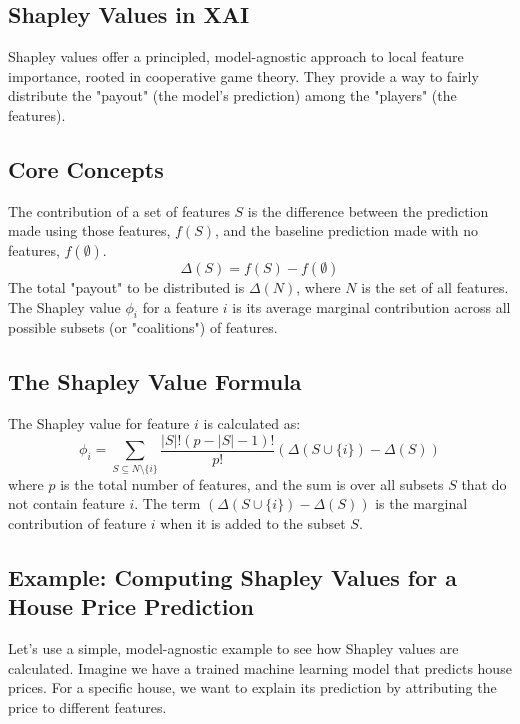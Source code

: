 \documentclass{article}
\begin{document}
\begin{multicols}{2}
\section{Shapley Values in XAI}
Shapley values offer a principled, model-agnostic approach to local feature importance, rooted in cooperative game theory. They provide a way to fairly distribute the "payout" (the model's prediction) among the "players" (the features).

\subsection{Core Concepts}
The contribution of a set of features $S$ is the difference between the prediction made using those features, $f(S)$, and the baseline prediction made with no features, $f(\emptyset)$.
$$ \Delta(S) = f(S) - f(\emptyset) $$
The total "payout" to be distributed is $\Delta(N)$, where $N$ is the set of all features. The Shapley value $\phi_i$ for a feature $i$ is its average marginal contribution across all possible subsets (or "coalitions") of features.

\subsection{The Shapley Value Formula}
The Shapley value for feature $i$ is calculated as:
$$ \phi_i = \sum_{S \subseteq N \setminus \{i\}} \frac{|S|!(p - |S| - 1)!}{p!} \left( \Delta(S \cup \{i\}) - \Delta(S) \right) $$
where $p$ is the total number of features, and the sum is over all subsets $S$ that do not contain feature $i$. The term $(\Delta(S \cup \{i\}) - \Delta(S))$ is the marginal contribution of feature $i$ when it is added to the subset $S$.

\subsection{Example: Computing Shapley Values for a House Price Prediction}
Let's use a simple, model-agnostic example to see how Shapley values are calculated. Imagine we have a trained machine learning model that predicts house prices. For a specific house, we want to explain its prediction by attributing the price to different features.


\end{multicols}
\end{document}
